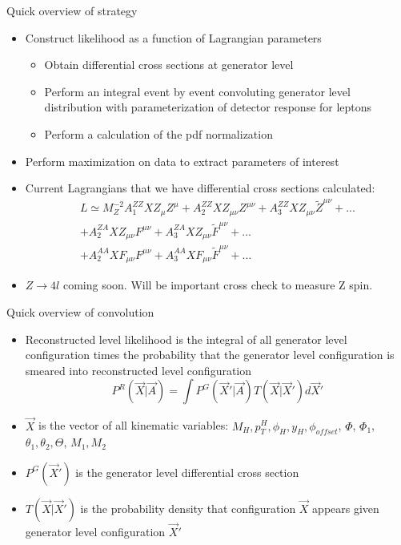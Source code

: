 \documentclass[11pt,t]{beamer}
\begin{document}
\begin{frame}{Quick overview of strategy}
   \begin{itemize}
   \item Construct likelihood as a function of Lagrangian parameters
      \begin{itemize}
      \item Obtain differential cross sections at generator level
      \item Perform an integral event by event convoluting generator level distribution
      with parameterization of detector response for leptons
      \item Perform a calculation of the pdf normalization
      \end{itemize}
   \item Perform maximization on data to extract parameters of interest
   \item Current Lagrangians that we have differential cross sections calculated:
   \begin{eqnarray}
   L \simeq M_Z^{-2} A_1^{ZZ} X Z_\mu Z^\mu + A_2^{ZZ} X Z_{\mu\nu} Z^{\mu\nu} + A_3^{ZZ} X Z_{\mu\nu} \tilde{Z}^{\mu\nu} + ...\nonumber\\
   + A_2^{ZA} X Z_{\mu\nu} F^{\mu\nu} + A_3^{ZA} X Z_{\mu\nu} \tilde{F}^{\mu\nu}\nonumber + ...\nonumber\\
   + A_2^{AA} X F_{\mu\nu} F^{\mu\nu} + A_3^{AA} X F_{\mu\nu} \tilde{F}^{\mu\nu}\nonumber + ...\nonumber
   \end{eqnarray}
   \item $Z \rightarrow 4l$ coming soon.  Will be important cross check to measure Z spin.
   \end{itemize}
\end{frame}

\begin{frame}{Quick overview of convolution}
   \begin{itemize}
   \item Reconstructed level likelihood is the integral of all generator level configuration times the probability
   that the generator level configuration is smeared into reconstructed level configuration
   \begin{equation}
      P^R(\vec{X} | \vec{A}) = \int P^G(\vec{X}' | \vec{A}) T(\vec{X} | \vec{X}') d \vec{X}'\nonumber
   \end{equation}
   \item $\vec{X}$ is the vector of all kinematic variables: $M_H, p_T^H, \phi_H, y_H, \phi_{offset}$, $\Phi$, $\Phi_1$, $\theta_1, \theta_2, \Theta$, $M_1, M_2$
   \item $P^G(\vec{X}')$ is the generator level differential cross section
   \item $T(\vec{X} | \vec{X}')$ is the probability density that configuration $\vec{X}$ appears given generator level configuration $\vec{X}'$
   \end{itemize}
\end{frame}
\end{document}
